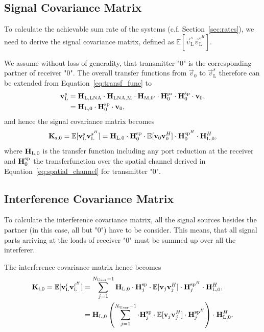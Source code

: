 \subsection{Signal Covariance Matrix}
\label{sec:sig_cov}
To calculate the achievable sum rate of the systems (c.f. Section~\ref{sec:rates}), we need to derive the signal covariance matrix, defined as $\mathbb{E}[\vec{v}_\text{L}^s\vec{v}_\text{L}^{s^H}]$.

We assume without loss of generality, that transmitter "0" is the corresponding partner of receiver "0".
The overall transfer functions from $\vec{v}_0$ to $\vec{v}_\text{L}^s$ therefore can be extended from Equation~\eqref{eq:transf_func} to
\begin{align}
\label{eq:transfer_function}
 \mathbf{v}_\text{L}^s&= \mathbf{H}_\text{L,LNA}\cdot\mathbf{H}_\text{LNA,M}\cdot\mathbf{H}_\text{M,0'}
		\cdot \mathbf{H}_0^{\text{pr}}\cdot\mathbf{H}_{0}^{\text{sp}} \cdot\mathbf{v}_0,\\\nonumber
 &=\mathbf{H}_\text{L,0}\cdot \mathbf{H}_{0}^{\text{sp}}\cdot\mathbf{v}_0,
\end{align}
and hence the signal covariance matrix becomes
\begin{equation}
\label{eq:sig_cov}
\mathbf{K}_{\text{s},0}=\mathbb{E}[\mathbf{v}_\text{L}^s\mathbf{v}_\text{L}^{s^H}] = 
	\mathbf{H}_\text{L,0}\cdot \mathbf{H}_{0}^{\text{sp}}
	\cdot\mathbb{E}[\mathbf{v}_0\mathbf{v}_0^H]\cdot
	\mathbf{H}_{0}^{\text{sp}^H} \cdot \mathbf{H}_\text{L,0}^H,
\end{equation}
where $\mathbf{H}_\text{L,0}$ is the transfer function including any port reduction at the receiver and $\mathbf{H}_{0}^{\text{sp}}$ the transferfunction over the spatial channel derived in Equation~\eqref{eq:spatial_channel} for transmitter "0".

\subsection{Interference Covariance Matrix}
\label{sec:int_cov}

To calculate the interference covariance matrix, all the signal sources besides the partner (in this case, all but "0") have to be consider.
This means, that all signal parts arriving at the loads of receiver "0" must be summed up over all the interferer.

The interference covariance matrix hence becomes 
\begin{align}
\label{eq:interf_cov}\nonumber
\mathbf{K}_{\text{i},0}=\mathbb{E}[\mathbf{v}_\text{L}^i\mathbf{v}_\text{L}^{i^H}] &= \sum_{j=1}^{N_\text{User}-1} 
	\mathbf{H}_\text{L,0} \cdot \mathbf{H}_{j}^{\text{sp}} \cdot 
	\mathbb{E}[\mathbf{v}_{j}\mathbf{v}_{j}^H] \cdot 
	\mathbf{H}_{j}^{\text{sp}^H} \cdot \mathbf{H}_\text{L,0}^H,\\
	&= \mathbf{H}_\text{L,0} \left(\sum_{j=1}^{N_\text{User}-1} 
	\cdot \mathbf{H}_{j}^{\text{sp}} \cdot 
	\mathbb{E}[\mathbf{v}_{j}\mathbf{v}_{j}^H] \cdot 
	\mathbf{H}_{j}^{\text{sp}^H}\right) \cdot \mathbf{H}_\text{L,0}^H.
\end{align}


